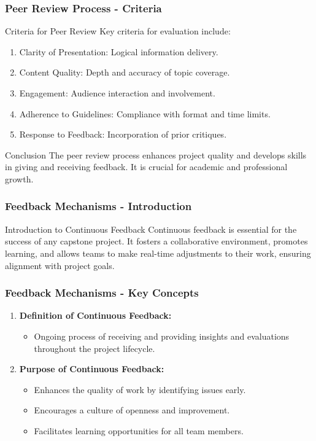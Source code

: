 \documentclass[aspectratio=169]{beamer}
\begin{document}
\begin{frame}[fragile]
  \frametitle{Peer Review Process - Criteria}
  \begin{block}{Criteria for Peer Review}
    Key criteria for evaluation include:
    \begin{enumerate}
      \item Clarity of Presentation: Logical information delivery.
      \item Content Quality: Depth and accuracy of topic coverage.
      \item Engagement: Audience interaction and involvement.
      \item Adherence to Guidelines: Compliance with format and time limits.
      \item Response to Feedback: Incorporation of prior critiques.
    \end{enumerate}
  \end{block}

  \begin{block}{Conclusion}
    The peer review process enhances project quality and develops skills in giving and receiving feedback. It is crucial for academic and professional growth.
  \end{block}
\end{frame}

\begin{frame}[fragile]
    \frametitle{Feedback Mechanisms - Introduction}
    \begin{block}{Introduction to Continuous Feedback}
        Continuous feedback is essential for the success of any capstone project. It fosters a collaborative environment, promotes learning, and allows teams to make real-time adjustments to their work, ensuring alignment with project goals.
    \end{block}
\end{frame}

\begin{frame}[fragile]
    \frametitle{Feedback Mechanisms - Key Concepts}
    \begin{enumerate}
        \item \textbf{Definition of Continuous Feedback:}
        \begin{itemize}
            \item Ongoing process of receiving and providing insights and evaluations throughout the project lifecycle.
        \end{itemize}
        \item \textbf{Purpose of Continuous Feedback:}
        \begin{itemize}
            \item Enhances the quality of work by identifying issues early.
            \item Encourages a culture of openness and improvement.
            \item Facilitates learning opportunities for all team members.
        \end{itemize}
    \end{enumerate}
\end{frame}
\end{document}
